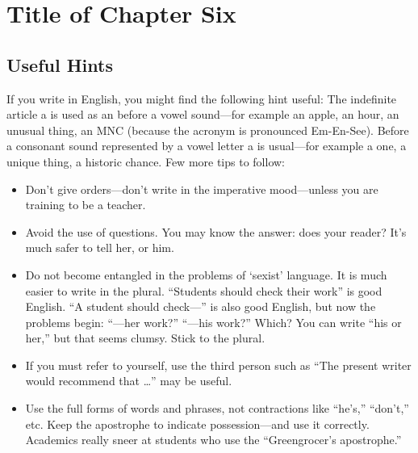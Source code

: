 \chapter{Title of Chapter Six}
\label{chap:six}
\section{Useful Hints}

If you write in English, you might find the following hint
useful: The indefinite article a is used as an before a
vowel sound---for example an apple, an hour, an unusual
thing, an \ac{MNC} (because the acronym is pronounced Em-En-See). Before a consonant sound represented
by a vowel letter a is usual---for example a one, a
unique thing, a historic chance. Few more tips to follow:


\begin{itemize}
\item Don't give orders---don't write in the imperative mood---unless you are training to be a teacher.
\item Avoid the use of questions. You may know the answer: does your reader?
It's much safer to tell her, or him.
\item Do not become entangled in the problems of `sexist' language.
It is much easier to write in the plural.
``Students should check their work'' is good English.
``A student should check---'' is also good English, but now the problems begin: ``---her work?'' ``---his work?''
Which? You can write ``his or her,'' but that seems clumsy. Stick to the plural.
\item If you must refer to yourself, use the third person such as ``The present writer would recommend that \ldots'' may be useful.
\item Use the full forms of words and phrases, not contractions like ``he's,'' ``don't,'' etc.
Keep the apostrophe to indicate possession---and use it correctly.
Academics really sneer at students who use the ``Greengrocer's apostrophe.''
\end{itemize}


